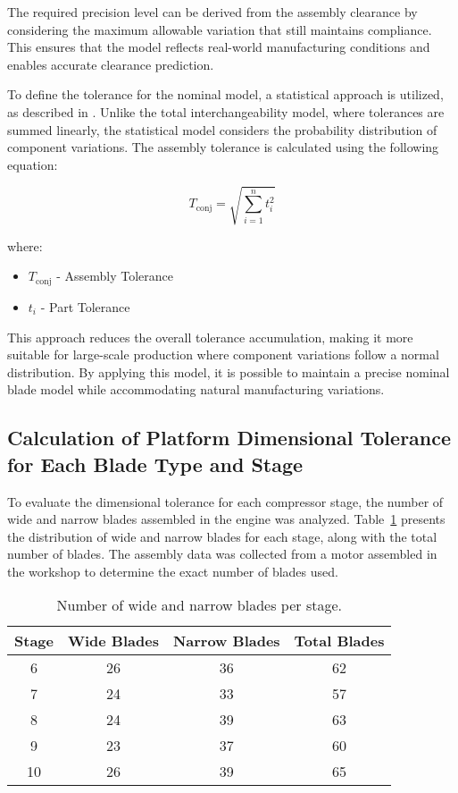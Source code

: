 The required precision level can be derived from the assembly clearance by considering the maximum allowable variation that still maintains compliance. This ensures that the model reflects real-world manufacturing conditions and enables accurate clearance prediction.

To define the tolerance for the nominal model, a statistical approach is utilized, as described in \cite{TSM}. Unlike the total interchangeability model, where tolerances are summed linearly, the statistical model considers the probability distribution of component variations. The assembly tolerance is calculated using the following equation:

\begin{equation}
    T_{\text{conj}} = \sqrt{\sum_{i=1}^{n} t_i^2}
    \label{eq:estat}
\end{equation}

where:
\begin{itemize}
\item $T_{\text{conj}}$ - Assembly Tolerance
\item $t_i$ - Part Tolerance
\end{itemize}

This approach reduces the overall tolerance accumulation, making it more suitable for large-scale production where component variations follow a normal distribution. By applying this model, it is possible to maintain a precise nominal blade model while accommodating natural manufacturing variations.

\subsection{Calculation of Platform Dimensional Tolerance for Each Blade Type and Stage}
\label{subsec:clearance_calculation}
To evaluate the dimensional tolerance for each compressor stage, the number of wide and narrow blades assembled in the engine was analyzed. Table~\ref{tab:blade_distribution} presents the distribution of wide and narrow blades for each stage, along with the total number of blades.
The assembly data was collected from a motor assembled in the workshop to determine the exact number of blades used.
\begin{table}[h]
    \centering
    \begin{tabular}{@{}cccc@{}}
        \toprule
        Stage & Wide Blades & Narrow Blades & Total Blades \\ 
        \midrule
        6  & 26 & 36 & 62 \\ 
        7  & 24 & 33 & 57 \\ 
        8  & 24 & 39 & 63 \\ 
        9  & 23 & 37 & 60 \\ 
        10 & 26 & 39 & 65 \\ 
        \bottomrule
    \end{tabular}
    \caption{Number of wide and narrow blades per stage.}
    \label{tab:blade_distribution}
\end{table}

